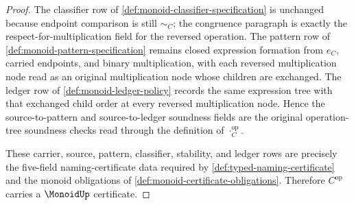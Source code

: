 \begin{proof}
The classifier row of \autoref{def:monoid-classifier-specification} is unchanged because endpoint comparison is still $\sim_C$; the congruence paragraph is exactly the respect-for-multiplication field for the reversed operation. The pattern row of \autoref{def:monoid-pattern-specification} remains closed expression formation from $e_C$, carried endpoints, and binary multiplication, with each reversed multiplication node read as an original multiplication node whose children are exchanged. The ledger row of \autoref{def:monoid-ledger-policy} records the same expression tree with that exchanged child order at every reversed multiplication node. Hence the source-to-pattern and source-to-ledger soundness fields are the original operation-tree soundness checks read through the definition of $\cdot_C^{\mathrm{op}}$.

These carrier, source, pattern, classifier, stability, and ledger rows are precisely the five-field naming-certificate data required by \autoref{def:typed-naming-certificate} and the monoid obligations of \autoref{def:monoid-certificate-obligations}. Therefore $C^{\mathrm{op}}$ carries a $\MonoidUp$ certificate.
\end{proof}

